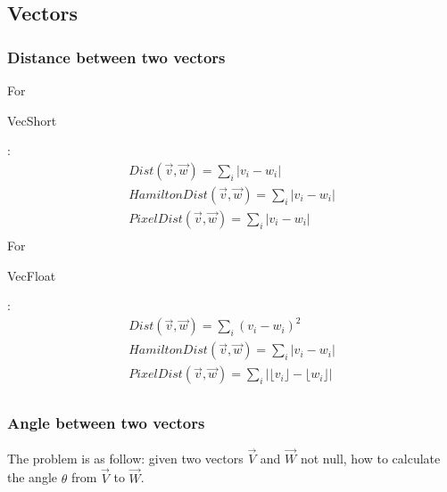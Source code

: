 \documentclass[12pt, a4paper]{article}
\begin{document}
\subsection{Vectors}

\subsubsection{Distance between two vectors}

For \begin{ttfamily}VecShort\end{ttfamily}:\\

\begin{equation}
\begin{array}{l}
Dist(\overrightarrow{v},\overrightarrow{w})=\sum_i|v_i-w_i|\\
HamiltonDist(\overrightarrow{v},\overrightarrow{w})=\sum_i|v_i-w_i|\\
PixelDist(\overrightarrow{v},\overrightarrow{w})=\sum_i|v_i-w_i|\\
\end{array}
\end{equation}
For \begin{ttfamily}VecFloat\end{ttfamily}:\\
\begin{equation}
\begin{array}{l}
Dist(\overrightarrow{v},\overrightarrow{w})=\sum_i(v_i-w_i)^2\\
HamiltonDist(\overrightarrow{v},\overrightarrow{w})=\sum_i|v_i-w_i|\\
PixelDist(\overrightarrow{v},\overrightarrow{w})=\sum_i\left|\lfloor v_i\rfloor -\lfloor w_i\rfloor\right|\\
\end{array}
\end{equation}


\subsubsection{Angle between two vectors}

The problem is as follow: given two vectors $\vec{V}$ and $\vec{W}$ not null, how to calculate the angle $\theta$ from $\vec{V}$ to $\vec{W}$.\\
\end{document}
